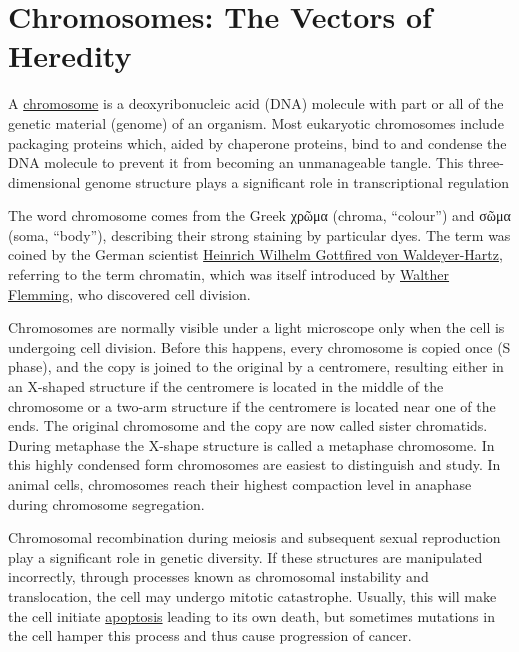 \chapter{Chromosomes: The Vectors of Heredity}\label{chromosomes-the-vectors-of-heredity}

A \href{https://en.wikipedia.org/wiki/Chromosome}{chromosome} is a deoxyribonucleic acid (DNA) molecule with part or all of the genetic material (genome) of an organism. Most eukaryotic chromosomes include packaging proteins which, aided by chaperone proteins, bind to and condense the DNA molecule to prevent it from becoming an unmanageable tangle. This three-dimensional genome structure plays a significant role in transcriptional regulation

The word chromosome comes from the Greek χρῶμα (chroma, ``colour'') and σῶμα (soma, ``body''), describing their strong staining by particular dyes. The term was coined by the German scientist \href{https://en.wikipedia.org/wiki/Heinrich_Wilhelm_Gottfried_von_Waldeyer-Hartz}{Heinrich Wilhelm Gottfired von Waldeyer-Hartz}, referring to the term chromatin, which was itself introduced by \href{https://en.wikipedia.org/wiki/Walther_Flemming}{Walther Flemming}, who discovered cell division.

Chromosomes are normally visible under a light microscope only when the cell is undergoing cell division. Before this happens, every chromosome is copied once (S phase), and the copy is joined to the original by a centromere, resulting either in an X-shaped structure if the centromere is located in the middle of the chromosome or a two-arm structure if the centromere is located near one of the ends. The original chromosome and the copy are now called sister chromatids. During metaphase the X-shape structure is called a metaphase chromosome. In this highly condensed form chromosomes are easiest to distinguish and study. In animal cells, chromosomes reach their highest compaction level in anaphase during chromosome segregation.

Chromosomal recombination during meiosis and subsequent sexual reproduction play a significant role in genetic diversity. If these structures are manipulated incorrectly, through processes known as chromosomal instability and translocation, the cell may undergo mitotic catastrophe. Usually, this will make the cell initiate \href{https://en.wikipedia.org/wiki/Apoptosis}{apoptosis} leading to its own death, but sometimes mutations in the cell hamper this process and thus cause progression of cancer.

